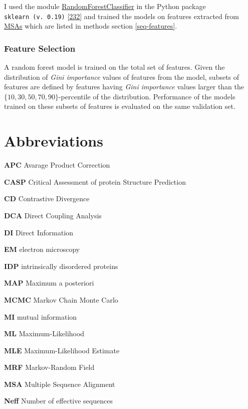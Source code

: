 \documentclass[11pt,a4paper,twoside]{book}
\theoremstyle{definition}
\theoremstyle{definition}
\theoremstyle{remark}
\begin{document}
I used the module
\href{http://scikit-learn.org/stable/modules/generated/sklearn.ensemble.RandomForestClassifier.html\#sklearn.ensemble.RandomForestClassifier}{RandomForestClassifier}
in the Python package \texttt{sklearn\ (v.\ 0.19)}
{[}\protect\hyperlink{ref-Pedregosa2011}{232}{]} and trained the models
on features extracted from \protect\hyperlink{abbrev}{MSAs} which are
listed in methods section \ref{seq-features}.

\subsection{Feature Selection}\label{rf-feature-selection}

A random forest model is trained on the total set of features. Given the
distribution of \emph{Gini importance} values of features from the
model, subsets of features are defined by features having \emph{Gini
importance} values larger than the \(\{10, 30, 50, 70, 90\}\)-percentile
of the distribution. Performance of the models trained on these subsets
of features is evaluated on the same validation set.

\appendix


\hypertarget{abbrev}{\chapter{Abbreviations}\label{abbrev}}

\textbf{APC} Avarage Product Correction

\textbf{CASP} Critical Assessment of protein Structure Prediction

\textbf{CD} Contrastive Divergence

\textbf{DCA} Direct Coupling Analysis

\textbf{DI} Direct Information

\textbf{EM} electron microscopy

\textbf{IDP} intrinsically disordered proteins

\textbf{MAP} Maximum a posteriori

\textbf{MCMC} Markov Chain Monte Carlo

\textbf{MI} mutual information

\textbf{ML} Maximum-Likelihood

\textbf{MLE} Maximum-Likelihood Estimate

\textbf{MRF} Markov-Random Field

\textbf{MSA} Multiple Sequence Alignment

\textbf{Neff} Number of effective sequences
\end{document}
